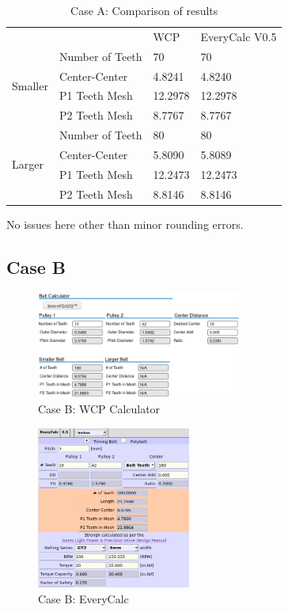 \documentclass[10pt,letterpaper]{article}
\begin{document}
	\begin{table}[H]
	\begin{tabular}{llll}
	                  &                 & WCP & EveryCalc V0.5 \\ \cline{1-4} 
	\multirow{4}{*}{Smaller} & Number of Teeth & 70      & 70      \\
			                 & Center-Center   & 4.8241  & 4.8240  \\
			                 & P1 Teeth Mesh   & 12.2978 & 12.2978 \\
			                 & P2 Teeth Mesh   & 8.7767  & 8.7767  \\ \cline{1-4} 
	\multirow{4}{*}{Larger}  & Number of Teeth & 80      & 80      \\
			                 & Center-Center   & 5.8090  & 5.8089  \\
			                 & P1 Teeth Mesh   & 12.2473 & 12.2473 \\
			                 & P2 Teeth Mesh   & 8.8146  & 8.8146  
	\end{tabular}
	\caption{Case A: Comparison of results}
	\end{table}

	No issues here other than minor rounding errors.

	\newpage

	\subsection*{Case B}

	\begin{figure}[H]
		\includegraphics[width=0.60\textwidth]{validation/belts_WCP_B.png}
		\caption{Case B: WCP Calculator}
	\end{figure}

	\begin{figure}[H]
		\includegraphics[width=0.45\textwidth]{validation/belts_EC_B.png}
		\caption{Case B: EveryCalc}
	\end{figure}
\end{document}

